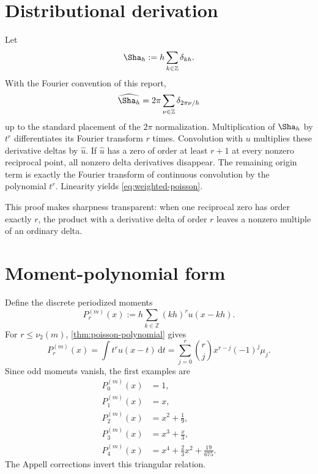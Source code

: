 \documentclass[11pt,oneside]{book}
\theoremstyle{definition}
\theoremstyle{remark}
\newcommand{\Z}{\mathbb Z}
\newcommand{\vtwo}{\nu_2}
\newcommand{\dd}{\,\mathrm d}
\begin{document}
\section{Distributional derivation}
Let
\begin{equation}
 \Sha_h:=h\sum_{k\in\Z}\delta_{kh}.
 \label{eq:dirac-comb}
\end{equation}
With the Fourier convention of this report,
\begin{equation}
 \widehat{\Sha_h}=2\pi\sum_{\nu\in\Z}\delta_{2\pi\nu/h}
 \label{eq:comb-fourier}
\end{equation}
up to the standard placement of the \(2\pi\) normalization.  Multiplication of \(\Sha_h\) by \(t^r\) differentiates its Fourier transform \(r\) times.  Convolution with \(u\) multiplies these derivative deltas by \(\widehat u\).  If \(\widehat u\) has a zero of order at least \(r+1\) at every nonzero reciprocal point, all nonzero delta derivatives disappear.  The remaining origin term is exactly the Fourier transform of continuous convolution by the polynomial \(t^r\).  Linearity yields \cref{eq:weighted-poisson}.

This proof makes sharpness transparent: when one reciprocal zero has order exactly \(r\), the product with a derivative delta of order \(r\) leaves a nonzero multiple of an ordinary delta.

\section{Moment-polynomial form}
Define the discrete periodized moments
\begin{equation}
 P_r^{(m)}(x):=h\sum_{k\in\Z}(kh)^r u(x-kh).
 \label{eq:periodized-moments}
\end{equation}
For \(r\le\vtwo(m)\), \cref{thm:poisson-polynomial} gives
\begin{equation}
 P_r^{(m)}(x)=\int t^ru(x-t)\dd t
 =\sum_{j=0}^{r}\binom rj x^{r-j}(-1)^j\mu_j.
 \label{eq:periodized-moment-polynomial}
\end{equation}
Since odd moments vanish, the first examples are
\begin{align*}
 P_0^{(m)}(x)&=1,\\
 P_1^{(m)}(x)&=x,\\
 P_2^{(m)}(x)&=x^2+\frac19,\\
 P_3^{(m)}(x)&=x^3+\frac{x}{3},\\
 P_4^{(m)}(x)&=x^4+\frac23x^2+\frac{19}{675}.
\end{align*}
The Appell corrections invert this triangular relation.
\end{document}
